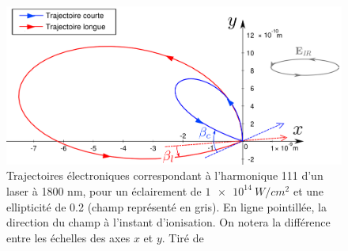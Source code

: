 \begin{figure}[!ht]
\centering
\includegraphics[width=0.9\columnwidth]{Figures/Polar/higuet.png}%
\caption{Trajectoires électroniques correspondant à l’harmonique 111 d'un laser à 1800 nm, pour un éclairement de $\SI{1e14}{W/cm^2}$ et une ellipticité de 0.2 (champ représenté en gris).
En ligne pointillée, la direction du champ à l’instant d’ionisation. On notera la différence entre les échelles
des axes $x$ et $y$. Tiré de }
\label{fig:ellhiguet}%
\end{figure}

